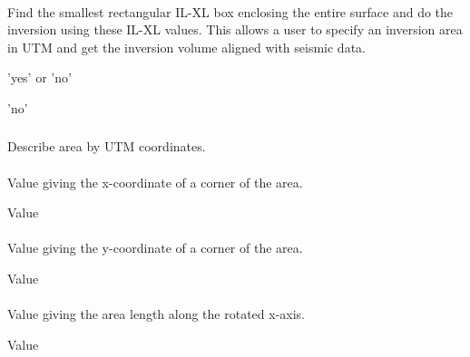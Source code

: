 \paragraph{}
\slist
   \item \Description Find the smallest rectangular IL-XL box
     enclosing the entire surface and do the inversion using these
     IL-XL values. This allows a user to specify an inversion area in
     UTM and get the inversion volume aligned with seismic data.
   \item \Argument  'yes' or 'no'
   \item \Default 'no'
 \elist


\subsubsection{}
 \slist
   \item \Description Describe area by UTM coordinates.
   \item \Argument
   \item \Default
 \elist

\paragraph{}
 \slist
   \item \Description Value giving the x-coordinate of a corner of the area.
   \item \Argument Value
   \item \Default
 \elist

\paragraph{}
 \slist
   \item \Description Value giving the y-coordinate of a corner of the area.
   \item \Argument Value
   \item \Default
 \elist

\paragraph{}
 \slist
   \item \Description Value giving the area length along the rotated x-axis.
   \item \Argument Value
   \item \Default
 \elist

